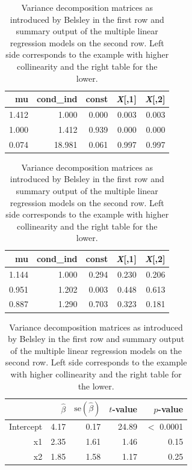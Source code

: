 \documentclass[11pt,a4paper,twoside]{book}\usepackage[]{graphicx}\usepackage[]{xcolor}
\begin{document}
\begin{table}[H]
\caption{Variance decomposition matrices as introduced by Belsley in the first row and summary output of the multiple linear regression models on the second row. Left side corresponds to the example with higher collinearity and the right table for the lower.}\label{tab:vdm1}
\begin{subtable}[h]{0.45\textwidth}
\centering
\begingroup\footnotesize
\begin{tabular}{rrrrr}
  \toprule
mu & cond\_ind & const & \textbf{\textit{X}}[,1] & \textbf{\textit{X}}[,2] \\ 
  \midrule
1.412 & 1.000 & 0.000 & 0.003 & 0.003 \\ 
  1.000 & 1.412 & 0.939 & 0.000 & 0.000 \\ 
  0.074 & 18.981 & 0.061 & 0.997 & 0.997 \\ 
   \bottomrule
\end{tabular}
\endgroup

\end{subtable}
\begin{subtable}[h]{0.45\textwidth}
\centering
\begingroup\footnotesize
\begin{tabular}{rrrrr}
  \toprule
mu & cond\_ind & const & \textbf{\textit{X}}[,1] & \textbf{\textit{X}}[,2] \\ 
  \midrule
1.144 & 1.000 & 0.294 & 0.230 & 0.206 \\ 
  0.951 & 1.202 & 0.003 & 0.448 & 0.613 \\ 
  0.887 & 1.290 & 0.703 & 0.323 & 0.181 \\ 
   \bottomrule
\end{tabular}
\endgroup

\end{subtable}
\centering
\begin{subtable}[h]{0.45\textwidth}
\vspace{0.2cm}
\begingroup\footnotesize
\begin{tabular}{rrrrr}
  \toprule
 & $\hat\beta$ & $\text{se}\left(\hat\beta\right)$ & $t$-value & $p$-value \\ 
  \midrule
Intercept & 4.17 & 0.17 & 24.89 & $<$ 0.0001 \\ 
  x1 & 2.35 & 1.61 & 1.46 & 0.15 \\ 
  x2 & 1.85 & 1.58 & 1.17 & 0.25 \\ 
   \bottomrule
\end{tabular}
\endgroup


\end{subtable}
\end{table}
\end{document}
